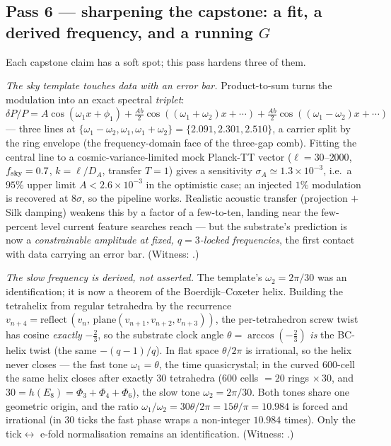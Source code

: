 \documentclass[11pt]{article}
\begin{document}
\subsection{Pass 6 --- sharpening the capstone: a fit, a derived frequency, and a running $G$}
\label{sec:capstone-sharper}

Each capstone claim has a soft spot; this pass hardens three of them.

\emph{The sky template touches data with an error bar.} Product-to-sum turns the
modulation into an exact spectral \emph{triplet}: $\delta P/P = A\cos(\omega_1 x+\phi_1)
+\tfrac{Ab}2\cos((\omega_1{+}\omega_2)x+\cdots)+\tfrac{Ab}2\cos((\omega_1{-}\omega_2)x
+\cdots)$ --- three lines at $\{\omega_1{-}\omega_2,\omega_1,\omega_1{+}\omega_2\}=
\{2.091,2.301,2.510\}$, a carrier split by the ring envelope (the frequency-domain face
of the three-gap comb). Fitting the central line to a cosmic-variance-limited mock
Planck-TT vector ($\ell=30$--$2000$, $f_{\rm sky}=0.7$, $k=\ell/D_A$, transfer $T=1$)
gives a sensitivity $\sigma_A\simeq1.3\times10^{-3}$, i.e.\ a $95\%$ upper limit
$A<2.6\times10^{-3}$ in the optimistic case; an injected $1\%$ modulation is recovered
at $8\sigma$, so the pipeline works. Realistic acoustic transfer (projection $+$ Silk
damping) weakens this by a factor of a few-to-ten, landing near the few-percent level
current feature searches reach --- but the substrate's prediction is now a
\emph{constrainable amplitude at fixed, $q=3$-locked frequencies}, the first contact
with data carrying an error bar. (Witness: .)

\emph{The slow frequency is derived, not asserted.} The template's $\omega_2=2\pi/30$ was
an identification; it is now a theorem of the Boerdijk--Coxeter helix. Building the
tetrahelix from regular tetrahedra by the recurrence $v_{n+4}=\mathrm{reflect}\,(v_n,\,
\mathrm{plane}(v_{n+1},v_{n+2},v_{n+3}))$, the per-tetrahedron screw twist has cosine
\emph{exactly} $-\tfrac23$, so the substrate clock angle $\theta=\arccos(-\tfrac23)$
\emph{is} the BC-helix twist (the same $-(q{-}1)/q$). In flat space $\theta/2\pi$ is
irrational, so the helix never closes --- the fast tone $\omega_1=\theta$, the time
quasicrystal; in the curved $600$-cell the same helix closes after exactly $30$
tetrahedra ($600$ cells $=20$ rings $\times\,30$, and $30=h(E_8)=\Phi_3{+}\Phi_4{+}\Phi_6$),
the slow tone $\omega_2=2\pi/30$. Both tones share one geometric origin, and the ratio
$\omega_1/\omega_2=30\theta/2\pi=15\theta/\pi=10.984$ is forced and irrational (in $30$
ticks the fast phase wraps a non-integer $10.984$ times). Only the tick$\leftrightarrow$
e-fold normalisation remains an identification. (Witness:
.)
\end{document}
